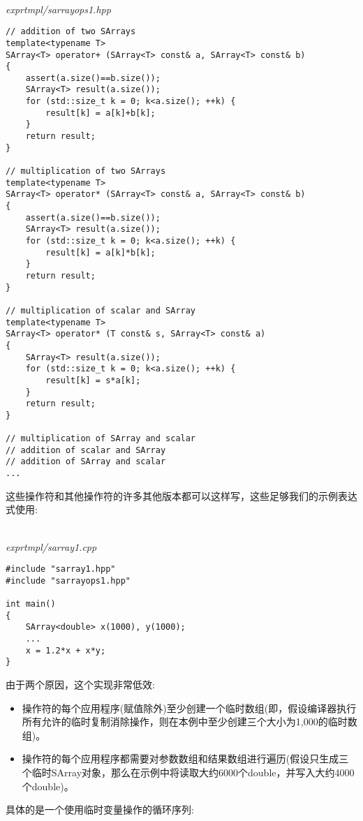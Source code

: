 \hspace*{\fill} \\ %
\noindent
\textit{exprtmpl/sarrayops1.hpp}
\begin{lstlisting}[style=styleCXX]
// addition of two SArrays
template<typename T>
SArray<T> operator+ (SArray<T> const& a, SArray<T> const& b)
{
	assert(a.size()==b.size());
	SArray<T> result(a.size());
	for (std::size_t k = 0; k<a.size(); ++k) {
		result[k] = a[k]+b[k];
	}
	return result;
}

// multiplication of two SArrays
template<typename T>
SArray<T> operator* (SArray<T> const& a, SArray<T> const& b)
{
	assert(a.size()==b.size());
	SArray<T> result(a.size());
	for (std::size_t k = 0; k<a.size(); ++k) {
		result[k] = a[k]*b[k];
	}
	return result;
}

// multiplication of scalar and SArray
template<typename T>
SArray<T> operator* (T const& s, SArray<T> const& a)
{
	SArray<T> result(a.size());
	for (std::size_t k = 0; k<a.size(); ++k) {
		result[k] = s*a[k];
	}
	return result;
}

// multiplication of SArray and scalar
// addition of scalar and SArray
// addition of SArray and scalar
...
\end{lstlisting}

这些操作符和其他操作符的许多其他版本都可以这样写，这些足够我们的示例表达式使用:

\hspace*{\fill} \\ %
\noindent
\textit{exprtmpl/sarray1.cpp}
\begin{lstlisting}[style=styleCXX]
#include "sarray1.hpp"
#include "sarrayops1.hpp"

int main()
{
	SArray<double> x(1000), y(1000);
	...
	x = 1.2*x + x*y;
}
\end{lstlisting}

由于两个原因，这个实现非常低效:

\begin{itemize}
\item 
操作符的每个应用程序(赋值除外)至少创建一个临时数组(即，假设编译器执行所有允许的临时复制消除操作，则在本例中至少创建三个大小为1,000的临时数组)。

\item 
操作符的每个应用程序都需要对参数数组和结果数组进行遍历(假设只生成三个临时SArray对象，那么在示例中将读取大约6000个double，并写入大约4000个double)。
\end{itemize}

具体的是一个使用临时变量操作的循环序列:


